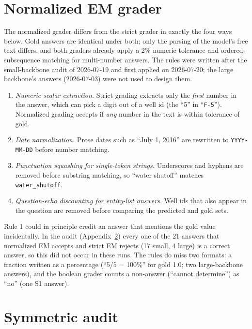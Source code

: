 \documentclass{article}
\begin{document}
\section{Normalized EM grader}
\label{app:grading}

The normalized grader differs from the strict grader in exactly the four ways
below. Gold answers are identical under both; only the parsing of the model's
free text differs, and both graders already apply a 2\% numeric tolerance and
ordered-subsequence matching for multi-number answers. The rules were written
after the small-backbone audit of 2026-07-19 and first applied on 2026-07-20;
the large backbone's answers (2026-07-03) were not used to design them.

\begin{enumerate}
  \item \emph{Numeric-scalar extraction.} Strict grading extracts only the
  \emph{first} number in the answer, which can pick a digit out of a well id
  (the ``5'' in ``\texttt{F-5}''). Normalized grading accepts if \emph{any}
  number in the text is within tolerance of gold.
  \item \emph{Date normalization.} Prose dates such as ``July 1, 2016'' are
  rewritten to \texttt{YYYY-MM-DD} before number matching.
  \item \emph{Punctuation squashing for single-token strings.} Underscores and
  hyphens are removed before substring matching, so ``water shutoff'' matches
  \texttt{water\_shutoff}.
  \item \emph{Question-echo discounting for entity-list answers.} Well ids that
  also appear in the question are removed before comparing the predicted and
  gold sets.
\end{enumerate}

Rule 1 could in principle credit an answer that mentions the gold value
incidentally. In the audit (Appendix~\ref{app:audit}) every one of the 21
answers that normalized EM accepts and strict EM rejects (17 small, 4 large) is
a correct answer, so this did not occur in these runs. The rules do miss two
formats: a fraction written as a percentage (``5/5 = 100\%'' for gold 1.0; two
large-backbone answers), and the boolean grader counts a non-answer (``cannot
determine'') as ``no'' (one S1 answer).

\section{Symmetric audit}
\label{app:audit}
\end{document}
